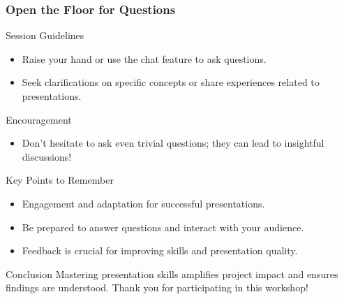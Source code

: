 \documentclass[aspectratio=169]{beamer}
\begin{document}
\begin{frame}[fragile]
    \frametitle{Open the Floor for Questions}
    \begin{block}{Session Guidelines}
        \begin{itemize}
            \item Raise your hand or use the chat feature to ask questions.
            \item Seek clarifications on specific concepts or share experiences related to presentations.
        \end{itemize}
    \end{block}
    \begin{block}{Encouragement}
        \begin{itemize}
            \item Don’t hesitate to ask even trivial questions; they can lead to insightful discussions!
        \end{itemize}
    \end{block}
    
    \begin{block}{Key Points to Remember}
        \begin{itemize}
            \item Engagement and adaptation for successful presentations.
            \item Be prepared to answer questions and interact with your audience.
            \item Feedback is crucial for improving skills and presentation quality.
        \end{itemize}
    \end{block}
    
    \begin{block}{Conclusion}
        Mastering presentation skills amplifies project impact and ensures findings are understood. Thank you for participating in this workshop!
    \end{block}
\end{frame}
\end{document}
